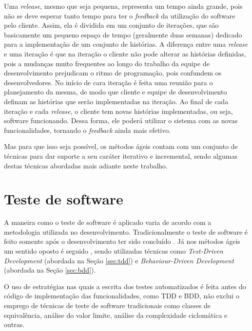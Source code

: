 Uma \textit{release}, mesmo que seja pequena, representa um tempo ainda grande, pois não se deve esperar tanto tempo para ter o \textit{feedback} da utilização do software pelo cliente. Assim, ela é dividida em um conjunto de iterações, que são basicamente um pequeno espaço de tempo (geralmente duas semanas) dedicado para a implementação de um conjunto de histórias. A diferença entre uma \textit{release} e uma iteração é que na iteração o cliente não pode alterar as histórias definidas, pois a mudanças muito frequentes ao longo do trabalho da equipe de desenvolvimento prejudicam o ritmo de programação, pois confundem os desenvolvedores. No início de cara iteração é feita uma reunião para o planejamento da mesma, de modo que cliente e equipe de desenvolvimento definam as histórias que serão implementadas na iteração. Ao final de cada iteração e cada \textit{release}, o cliente tem novas histórias implementadas, ou seja, software funcionando. Dessa forma, ele poderá utilizar o sistema com as novas funcionalidades, tornando o \textit{feedback} ainda mais efetivo.

Mas para que isso seja possível, os métodos ágeis contam com um conjunto de técnicas para dar suporte a seu caráter iterativo e incremental, sendo algumas destas técnicas abordadas mais adiante neste trabalho.



\section{Teste de software}
\label{sec:teste_de_software}


A maneira como o teste de software é aplicado varia de acordo com a metodologia utilizada no desenvolvimento. Tradicionalmente o teste de software é feito somente após o desenvolvimento ter sido concluído \cite{TesteSoftware, Pressman}. Já nos métodos ágeis um sentido oposto é seguido \cite{ArtOfAgileDevelopment}, sendo utilizadas técnicas como \textit{Test-Driven Development} (abordada na Seção \ref{sec:tdd}) e \textit{Behaviour-Driven Development} (abordada na Seção \ref{sec:bdd}).

O uso de estratégias nas quais a escrita dos testes automatizados é feita antes do código de implementação das funcionalidades, como TDD e BDD, não exclui o emprego de técnicas de teste de software tradicionais como classes de equivalência, análise do valor limite, análise da complexidade ciclomática e outras.

